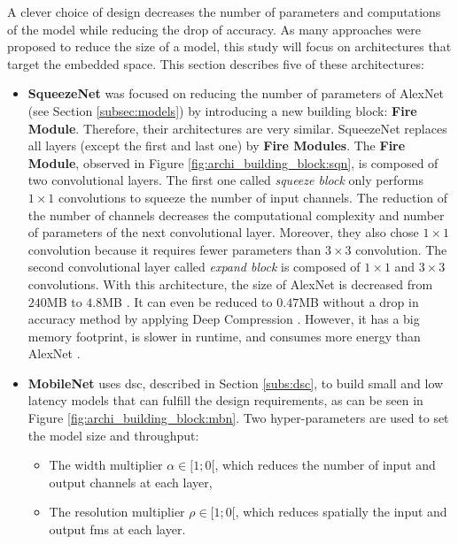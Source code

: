 A clever choice of design decreases the number of parameters and computations of the model while reducing the drop of accuracy. As many approaches were proposed to reduce the size of a model, this study will focus on architectures that target the embedded space. This section describes five of these architectures:
\begin{itemize}
    \item \textbf{SqueezeNet} \cite{iandola_squeezenet_2016} was focused on reducing the number of parameters of AlexNet (see Section \ref{subsec:models}) by introducing a new building block: \textbf{Fire Module}. Therefore, their architectures are very similar. SqueezeNet replaces all layers (except the first and last one) by \textbf{Fire Modules}. The \textbf{Fire Module}, observed in Figure \ref{fig:archi_building_block:sqn}, is composed of two convolutional layers. The first one called \textit{squeeze block} only performs $1 \times 1$ convolutions to squeeze the number of input channels. The reduction of the number of channels decreases the computational complexity and number of parameters of the next convolutional layer. Moreover, they also chose $1 \times 1$ convolution because it requires fewer parameters than $3 \times 3$ convolution.
    The second convolutional layer called \textit{expand block} is composed of $1 \times 1$ and $3 \times 3$ convolutions. With this architecture, the size of AlexNet is decreased from $240$MB to $4.8$MB \cite{iandola_squeezenet_2016}. It can even be reduced to $0.47$MB without a drop in accuracy method by applying Deep Compression \cite{han_deep_2016}. However, it has a big memory footprint, is slower in runtime, and consumes more energy than AlexNet \cite{sze_efficient_2017}.
    \item \textbf{MobileNet} \cite{howard_mobilenets_2017} uses \acrshort{dsc}, described in Section \ref{subs:dsc}, to build small and low latency models that can fulfill the design requirements, as can be seen in Figure \ref{fig:archi_building_block:mbn}. Two hyper-parameters are used to set the model size and throughput:
    \begin{itemize}
        \item The width multiplier $\alpha \in [1; 0[$, which reduces the number of input and output channels at each layer,
        \item The resolution multiplier $\rho \in [1; 0[$,  which reduces spatially the input and output \acrshort{fm}s at each layer.
    \end{itemize}

\end{itemize}
